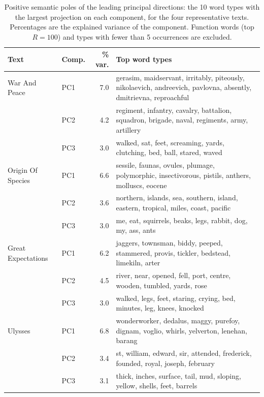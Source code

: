 \begin{table}[htbp]
\centering
\small
\caption{Positive semantic poles of the leading principal directions: the 10 word types with the largest projection on each component, for the four representative texts. Percentages are the explained variance of the component. Function words (top $R=100$) and types with fewer than 5 occurrences are excluded.}
\label{tab:poles}
\begin{tabular}{llrp{}}
\toprule
Text & Comp. & \% var. & Top word types \\
\midrule
War And Peace & PC1 & 7.0 & gerasim, maidservant, irritably, piteously, nikolaevich, andreevich, pavlovna, absently, dmitrievna, reproachful \\
 & PC2 & 4.2 & regiment, infantry, cavalry, battalion, squadron, brigade, naval, regiments, army, artillery \\
 & PC3 & 3.0 & walked, sat, feet, screaming, yards, clutching, bed, ball, stared, waved \\
\midrule
Origin Of Species & PC1 & 6.6 & sessile, faunas, ovules, plumage, polymorphic, insectivorous, pistils, anthers, molluscs, eocene \\
 & PC2 & 3.6 & northern, islands, sea, southern, island, eastern, tropical, miles, coast, pacific \\
 & PC3 & 3.0 & me, eat, squirrels, beaks, legs, rabbit, dog, my, ass, ants \\
\midrule
Great Expectations & PC1 & 6.2 & jaggers, townsman, biddy, peeped, stammered, provis, tickler, bedstead, limekiln, arter \\
 & PC2 & 4.5 & river, near, opened, fell, port, centre, wooden, tumbled, yards, rose \\
 & PC3 & 3.0 & walked, legs, feet, staring, crying, bed, minutes, leg, knees, knocked \\
\midrule
Ulysses & PC1 & 6.8 & wonderworker, dedalus, maggy, purefoy, dignam, voglio, whirls, yelverton, lenehan, barang \\
 & PC2 & 3.4 & st, william, edward, sir, attended, frederick, founded, royal, joseph, february \\
 & PC3 & 3.1 & thick, inches, surface, tail, mud, sloping, yellow, shells, feet, barrels \\
\bottomrule
\end{tabular}
\end{table}
